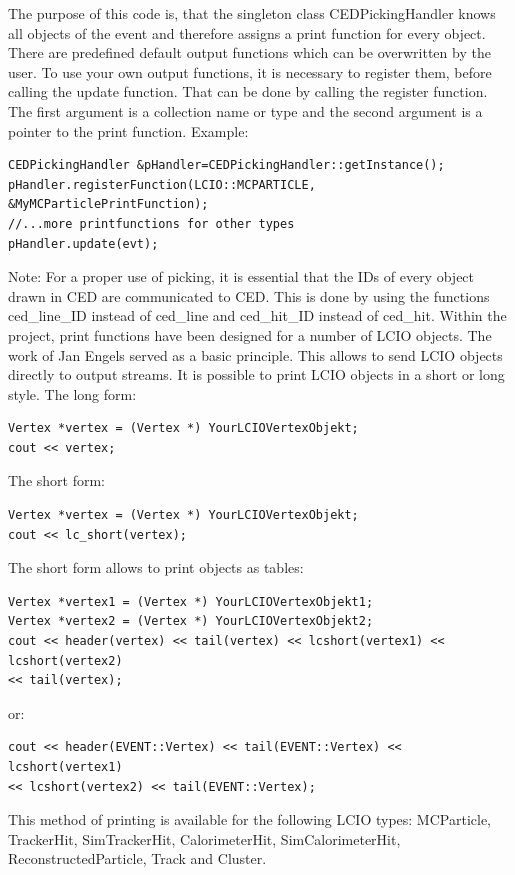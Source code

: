 \documentclass[a4paper,10pt]{article}
\begin{document}
The purpose of this code is, that the singleton class CEDPickingHandler knows all objects of the event and therefore assigns a print function for every object. There are predefined default output functions which can be overwritten by the user. To use your own output functions, it is necessary to register them, before calling the update function. That can be done by
calling the register function. The first argument is a collection name or type and the second argument is a pointer to the print function.
Example:
\begin{verbatim}
CEDPickingHandler &pHandler=CEDPickingHandler::getInstance();
pHandler.registerFunction(LCIO::MCPARTICLE, &MyMCParticlePrintFunction);
//...more printfunctions for other types
pHandler.update(evt);
\end{verbatim}

Note: For a proper use of picking, it is essential that the IDs of every object drawn in CED are communicated to CED. This is done by using the functions ced\_line\_ID instead of ced\_line and ced\_hit\_ID instead of ced\_hit. 
\newline
Within the project, print functions have been designed for a number of LCIO objects. The work of Jan Engels served as a basic principle. This allows to send LCIO objects directly to output streams. It is possible to print LCIO objects in a short or long style. The long form:

\begin{verbatim}
Vertex *vertex = (Vertex *) YourLCIOVertexObjekt;
cout << vertex;
\end{verbatim}
The short form:
\begin{verbatim}
Vertex *vertex = (Vertex *) YourLCIOVertexObjekt;
cout << lc_short(vertex);
\end{verbatim}
The short form allows to print objects as tables:
\begin{verbatim}
Vertex *vertex1 = (Vertex *) YourLCIOVertexObjekt1;
Vertex *vertex2 = (Vertex *) YourLCIOVertexObjekt2;
cout << header(vertex) << tail(vertex) << lcshort(vertex1) << lcshort(vertex2)
<< tail(vertex);
\end{verbatim}
or:
\begin{verbatim}
cout << header(EVENT::Vertex) << tail(EVENT::Vertex) << lcshort(vertex1)
<< lcshort(vertex2) << tail(EVENT::Vertex);
\end{verbatim}
This method of printing is available for the following LCIO types: MCParticle, TrackerHit,
SimTrackerHit, CalorimeterHit, SimCalorimeterHit, ReconstructedParticle, Track and Cluster.
\end{document}
